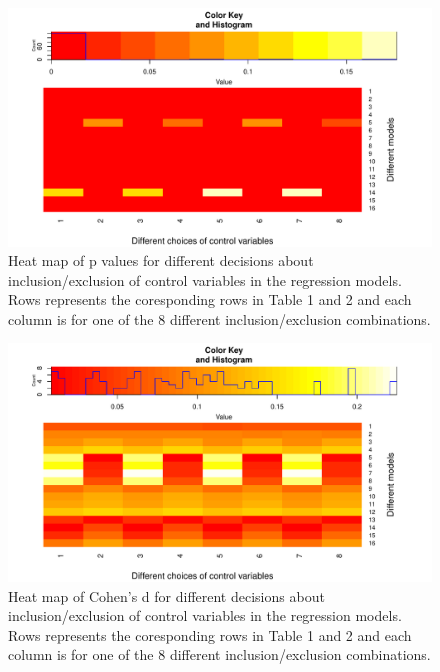 \documentclass[man]{apa6}
\theoremstyle{definition}
\theoremstyle{definition}
\theoremstyle{definition}
\theoremstyle{remark}
\begin{document}
\begin{figure}

\includegraphics{stats_6_final_files/figure-latex/heat-p-model-1} \hfill{}

\caption{Heat map of p values for different decisions about inclusion/exclusion of control variables in the regression models. Rows represents the coresponding rows in Table 1 and 2 and each column is for one of the 8 different inclusion/exclusion combinations.}\label{fig:heat-p-model}
\end{figure}

\begin{figure}

\includegraphics{stats_6_final_files/figure-latex/heat-d-model-1} \hfill{}

\caption{Heat map of Cohen's d for different decisions about inclusion/exclusion of control variables in the regression models. Rows represents the coresponding rows in Table 1 and 2 and each column is for one of the 8 different inclusion/exclusion combinations.}\label{fig:heat-d-model}
\end{figure}
\end{document}
